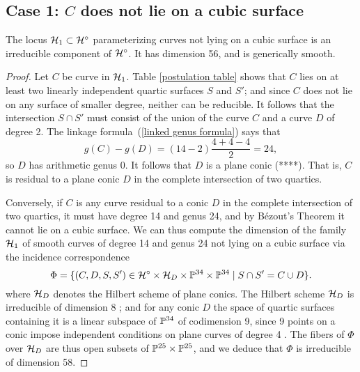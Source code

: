 \subsection{Case 1: $C$ does not lie on a cubic surface}

\begin{proposition}
The locus ${\cal H}_1 \subset {\cal H}^\circ$ parameterizing curves not lying on a cubic surface is an irreducible component of  ${\cal H}^\circ$. It has dimension 56, and is generically smooth.
\end{proposition} 
 
\begin{proof}
Let $C$ be curve in ${\cal H}_1$. Table \ref{postulation table} shows that $C$ lies on at least two linearly independent quartic surfaces $S$ and $S'$; and since $C$ does not lie on any surface of smaller degree, neither can be reducible. It follows that the intersection $S \cap S'$ must consist of the union of the curve $C$ and a curve $D$ of degree 2. The linkage formula~(\ref{linked genus formula}) says that
$$
g(C) - g(D) = (14 - 2)\frac{4+4-4}{2} = 24,
$$
so $D$ has arithmetic genus 0. It follows that $D$ is a plane conic (****).  That is, $C$ is residual to a plane conic $D$ in the complete intersection of two quartics. 

Conversely, if $C$ is any curve residual to a conic $D$ in the complete intersection of two quartics, it must have degree 14 and genus 24, and by B\'ezout's Theorem it cannot lie on a cubic surface. We can thus compute the dimension of the family ${\cal H}_1$ of smooth curves of degree 14 and genus 24 not lying on a cubic surface via the incidence correspondence
$$
\Phi = \{ (C, D, S, S') \in {\cal H}^\circ \times {\cal H}_D \times {\mathbb P}^{34} \times {\mathbb P}^{34} \mid S \cap S' = C \cup D\}.
$$
where ${\cal H}_D$ denotes the Hilbert scheme of plane conics. The Hilbert scheme ${\cal H}_D$ is irreducible of dimension 8 ; and for any conic $D$ the space of quartic surfaces containing it is a linear subspace of ${\mathbb P}^{34}$ of codimension 9, since 9  points on a conic impose independent conditions on plane curves of degree 4 . The fibers of $\Phi$ over ${\cal H}_D$ are thus open subsets of ${\mathbb P}^{25} \times {\mathbb P}^{25}$, and we deduce that $\Phi$ is irreducible of dimension 58. 


\end{proof}
